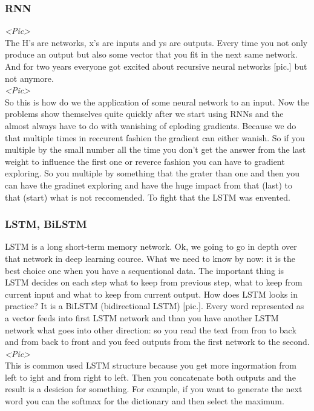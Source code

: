\subsubsection*{RNN}

{\it <Pic>}\\
The H's are networks, x's are inputs and ys are outputs. Every time you not only produce an output but also some vector that you  fit in the next same network. And for two years everyone got excited about recursive neural networks [pic.] but not anymore.\\
{\it <Pic>}\\
So this is how do we the application of some neural network to an input. Now the problems show themselves quite quickly after we start using RNNs and the almost always have to do with wanishing of eploding gradients. Because we do that multiple times in reccurent fashien the gradient can either wanish. So if you multiple by the small number all the time you don't get the answer from the last weight to influence the first one or reverce fashion you can have to gradient exploring. So you multiple by something that the grater than one and then you can have the gradinet exploring and have the huge impact from that (last) to that (start) what is not reccomended. To fight that the LSTM was envented.

\subsubsection*{LSTM, BiLSTM}

LSTM is a long short-term memory network. Ok, we going to go in depth over that network in deep learning cource. What we need to know by now: it is the best choice one when you have a sequentional data. The important thing is LSTM decides on each step what to keep from previous step, what to keep from current input and what to keep from current output. How does LSTM looks in practice? It is a BiLSTM (bidirectional LSTM) [pic.]. Every word represented as a vector feeds into first LSTM network and than you have another LSTM network what goes into other direction: so you read the text from fron to back and from back to front and you feed outputs from the first network to the second.\\
{\it <Pic>}\\
This is common used LSTM structure because you get more ingormation from left to ight and from right to left. Then you concatenate both outputs and the result is a desicion for something. For example, if you want to generate the next word you can the softmax for the dictionary and then select the maximum.\\

